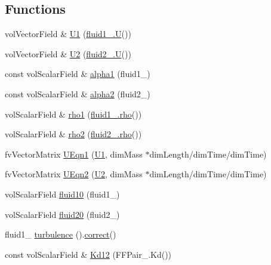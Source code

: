 \subsection*{Functions}
\begin{DoxyCompactItemize}
\item 
vol\+Vector\+Field \& \hyperlink{UEqns__2p_8H_a36d208f2338b1dd1ec90b2b1333d5f42}{U1} (\hyperlink{UEqn__1pl_8H_abe23fa3afe09cc511569a7dca4160561}{fluid1\+\_\+.\+U}())
\item 
vol\+Vector\+Field \& \hyperlink{UEqns__2p_8H_af55bc79119bfe60c39e86c5ddf988e7a}{U2} (\hyperlink{UEqn__1pl_8H_abe23fa3afe09cc511569a7dca4160561}{fluid2\+\_\+.\+U}())
\item 
const vol\+Scalar\+Field \& \hyperlink{UEqns__2p_8H_ad67e06bee4c61d3ec617e035493b4722}{alpha1} (fluid1\+\_\+)
\item 
const vol\+Scalar\+Field \& \hyperlink{UEqns__2p_8H_abe544d8197b804c4439afde6d860d5d7}{alpha2} (fluid2\+\_\+)
\item 
vol\+Scalar\+Field \& \hyperlink{UEqns__2p_8H_a80ad9333a5b4812b1033ab05efb3a65d}{rho1} (\hyperlink{EEqn__1pl_8H_ac955f87ac2b79f02f420cae087fc52b1}{fluid1\+\_\+.\+rho}())
\item 
vol\+Scalar\+Field \& \hyperlink{UEqns__2p_8H_a2a5e0e37e61560baf7b55ce8b70e01c0}{rho2} (\hyperlink{EEqn__1pl_8H_ac955f87ac2b79f02f420cae087fc52b1}{fluid2\+\_\+.\+rho}())
\item 
fv\+Vector\+Matrix \hyperlink{UEqns__2p_8H_aae13b369a8a095eff1fbd9502846e5ed}{U\+Eqn1} (\hyperlink{UEqns__2p_8H_a36d208f2338b1dd1ec90b2b1333d5f42}{U1}, dim\+Mass $\ast$dim\+Length/dim\+Time/dim\+Time)
\item 
fv\+Vector\+Matrix \hyperlink{UEqns__2p_8H_a22a244ef3f804b6129767149e4ff2e95}{U\+Eqn2} (\hyperlink{UEqns__2p_8H_af55bc79119bfe60c39e86c5ddf988e7a}{U2}, dim\+Mass $\ast$dim\+Length/dim\+Time/dim\+Time)
\item 
vol\+Scalar\+Field \hyperlink{UEqns__2p_8H_a3c803536c288a716ede4363139595977}{fluid10} (fluid1\+\_\+)
\item 
vol\+Scalar\+Field \hyperlink{UEqns__2p_8H_a02f706144cdc92fb5b9b6d4991109e32}{fluid20} (fluid2\+\_\+)
\item 
fluid1\+\_\+ \hyperlink{UEqns__2p_8H_a1769aacd25eec8e30f213b1c177e12d6}{turbulence} ().\hyperlink{hEqn_8H_a3a2458f7f54158be848527a3fdedd5dd}{correct}()
\item 
const vol\+Scalar\+Field \& \hyperlink{UEqns__2p_8H_a5bbf0de883575e238683e5a720a8e16e}{Kd12} (F\+F\+Pair\+\_\+.\+Kd())
\item 

\end{DoxyCompactItemize}
